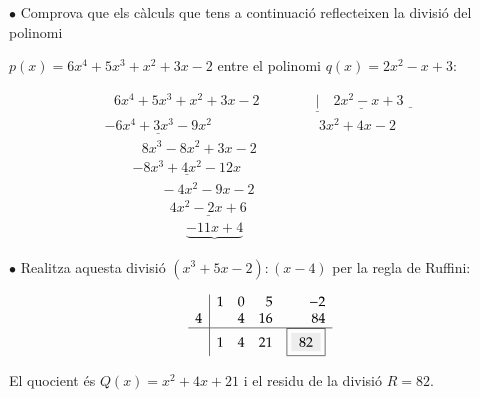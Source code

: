 \pagebreak

\begin{example}
 	$\bullet$ Comprova que els càlculs que tens a continuació reflecteixen la divisió del polinomi
	
	 $p(x)=6x^{4} +5x^{3} +x^{2} +3x-2$ entre el polinomi $q(x)=2x^{2} -x+3$:
	
	
	\[ \begin{array}{l} {\, \, \, \, 6x^{4} +5x^{3} +x^{2} +3x-2\quad \quad \quad \quad \underline{|}\underline{\quad 2x^{2} -x+3}\underline{\quad }} \\ {\underline{-6x^{4} +3x^{3} -9x^{2} }\, \, \, \, \, \, \, \, \, \, \, \, \, \, \, \, \, \, \, \, \, \, \, \, \, \, \, \, \, \, \, \, \, \, \, \, \, \, \, \, \quad 3x^{2} +4x-2\, } \\ {\, \, \, \, \, \, \, \, \, \, \, \, \, \, \, \, 8x^{3} -8x^{2} +3x-2} \\ {\, \, \, \, \, \, \, \, \, \, \, \, \underline{-8x^{3} +4x^{2} -12x}} \\ {\, \, \, \, \, \, \, \, \, \, \, \, \, \, \, \, \, \, \, \, \, \, \, \, -4x^{2} -9x-2} \\ {\, \, \, \, \, \, \, \, \, \, \, \, \, \, \, \, \, \, \, \, \, \, \, \, \, \, \, \, \underline{4x^{2} -2x+6}} \\ {\, \, \, \, \, \, \, \, \, \, \, \, \, \, \, \, \, \, \, \, \, \, \, \, \, \, \, \, \, \, \, \, \, \, \, \underbrace{-11x+4} } \end{array} \]
	
	
	$\bullet$ Realitza aquesta divisió $(x^3+5x-2) : (x-4)$ per la regla de Ruffini:
	
	\[ \begin{array}{r|rrrr}  & 1 & 0 & 5 & -2\\ 4 &  & 4 & 16 & 84 \\ \hline  & 1 & 4 & 21 & \examplebox{ 82 }\end{array} \]
	
	El quocient és $Q(x)=x^2+4x+21$ i el residu de la divisió $R=82$.
	\end{example}

